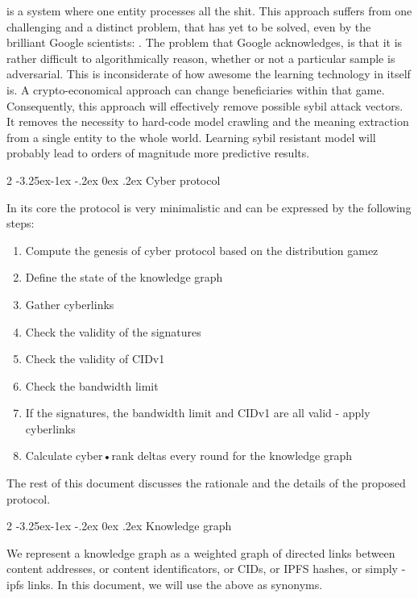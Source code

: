 \documentclass[8pt,oneside]{amsart}
\makeatletter
\newcommand{\linkgreen}[2]{\href{#1}{\color{green}{#2}}}
\renewcommand\subsection{\@startsection{subsection}
                                    {2}{\z@}
                                    {-3.25ex\@plus -1ex \@minus -.2ex}
                                    {0ex \@plus .2ex}
                                    {\play\Large}
                        }
\newcommand{\titleSection}[1]{\subsection{#1}}
\makeatother
\begin{document}
\linkgreen{https://ipfs.io/ipfs/QmeS4LjoL1iMNRGuyYSx78RAtubTT2bioSGnsvoaupcHR6}{The current architecture of search engines} is a system where one entity processes all the shit. This approach suffers from one challenging and a distinct problem, that has yet to be solved, even by the brilliant Google scientists: \linkgreen{https://ipfs.io/ipfs/QmNrAFz34SLqkzhSg4wAYYJeokfJU5hBEpkT4hPRi226y9}{the adversarial examples problem}. The problem that Google acknowledges, is that it is rather difficult to algorithmically reason, whether or not a particular sample is adversarial. This is inconsiderate of how awesome the learning technology in itself is. A crypto-economical approach can change beneficiaries within that game. Consequently, this approach will effectively remove possible sybil attack vectors. It removes the necessity to hard-code model crawling and the meaning extraction from a single entity to the whole world. Learning sybil resistant model will probably lead to orders of magnitude more predictive results.

\titleSection{Cyber protocol}\label{cyber-protocol}

In its core the protocol is very minimalistic and can be expressed by the following steps:

\begin{enumerate}[nosep]
\item Compute the genesis of cyber protocol based on the distribution gamez
\item Define the state of the knowledge graph
\item Gather cyberlinks
\item Check the validity of the signatures
\item Check the validity of CIDv1
\item Check the bandwidth limit
\item If the signatures, the bandwidth limit and CIDv1 are all valid - apply cyberlinks
\item Calculate cyber•rank deltas every round for the knowledge graph
\end{enumerate}

The rest of this document discusses the rationale and the details of the proposed protocol.

\titleSection{Knowledge graph}\label{knowledge-graph}

We represent a knowledge graph as a weighted graph of directed links between content addresses, or content identificators, or CIDs, or IPFS hashes, or simply - ipfs links. In this document, we will use the above as synonyms.
\end{document}
